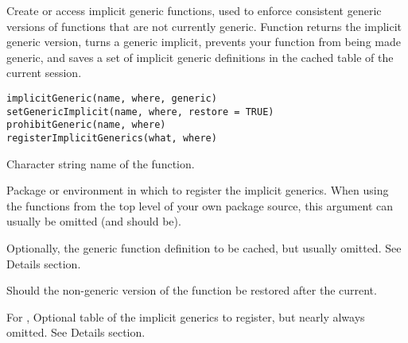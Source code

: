 %
\begin{Description}\relax
Create or access implicit generic functions, used to enforce
consistent generic versions of functions that are not currently
generic.  Function  returns the implicit
generic version,  turns a generic implicit,
 prevents your function from being made
generic, and  saves a set of implicit
generic definitions in the cached table of the current session.
\end{Description}
%
\begin{Usage}
\begin{verbatim}
implicitGeneric(name, where, generic)
setGenericImplicit(name, where, restore = TRUE)
prohibitGeneric(name, where)
registerImplicitGenerics(what, where)
\end{verbatim}
\end{Usage}
%
\begin{Arguments}
\begin{ldescription}
\item[\code{name}]  Character string name of the function.
\item[\code{where}]  Package or environment in which to register the implicit
generics.  When using the functions from the top level of your own
package source, this argument can usually be omitted (and should
be).
\item[\code{generic}]  Optionally, the generic function definition to be
cached, but usually omitted.   See Details section.
\item[\code{restore}] Should the non-generic version of the function be
restored after the current.
\item[\code{what}] For , Optional table of
the implicit generics to register, but nearly always omitted.   See
Details section.
\end{ldescription}
\end{Arguments}
%
